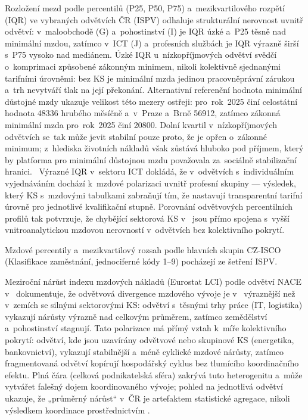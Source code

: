 Rozložení mezd podle percentilů (P25, P50, P75) a~mezikvartilového rozpětí (\ac{IQR}) ve vybraných odvětvích ČR (\ac{ISPV}) odhaluje strukturální nerovnost uvnitř odvětví: v~maloobchodě (G) a~pohostinství (I) je \ac{IQR} úzké a~P25 těsně nad minimální mzdou, zatímco v~ICT (J) a~profesních službách je \ac{IQR} výrazně širší s~P75 vysoko nad mediánem.
Úzké \ac{IQR} u~nízkopříjmových odvětví svědčí o~komprimaci způsobené zákonným minimem, nikoli kolektivně sjednanými tarifními úrovněmi: bez \ac{KS} je minimální mzda jedinou pracovněprávní zárukou a~trh nevytváří tlak na její překonání.
Alternativní referenční hodnota minimální důstojné mzdy ukazuje velikost této mezery ostřeji: pro~rok~2025 činí celostátní hodnota \SI{48336}{\czk} hrubého měsíčně a~v~Praze a~Brně \SI{56912}{\czk}, zatímco zákonná minimální mzda pro~rok~2025 činí \SI{20800}{\czk}. Dolní kvartil v~nízkopříjmových odvětvích se~tak může jevit stabilní pouze proto, že je opřen o~zákonné minimum; z~hlediska životních nákladů však zůstává hluboko pod příjmem, který by platforma pro minimální důstojnou mzdu považovala za~sociálně stabilizační hranici.~\cite{PlatformaMDM_TZ2025}
Výrazné \ac{IQR} v~sektoru ICT dokládá, že v~odvětvích s~individuálním vyjednáváním dochází k~mzdové polarizaci uvnitř profesní skupiny --- výsledek, který \ac{KS} s~mzdovými tabulkami zabraňují tím, že nastavují transparentní tarifní úrovně pro jednotlivé kvalifikační stupně.
Porovnání odvětvových percentilních profilů tak potvrzuje, že chybějící sektorová \ac{KS} v~ jsou přímo spojena s~vyšší vnitroanalytickou mzdovou nerovností v~odvětvích bez kolektivního pokrytí.

Mzdové percentily a~mezikvartilový rozsah podle hlavních skupin CZ-ISCO (Klasifikace zaměstnání, jednociferné kódy 1--9) pocházejí ze šetření \acs{ISPV}.\par

Meziroční nárůst indexu mzdových nákladů (Eurostat \ac{LCI}) podle odvětví \ac{NACE} v~ dokumentuje, že odvětvová divergence mzdového vývoje je v~ výraznější než v~zemích se silnými sektorovými \ac{KS}: odvětví s~těsnými trhy práce (IT, logistika) vykazují nárůsty výrazně nad celkovým průměrem, zatímco zemědělství a~pohostinství stagnují.
Tato polarizace má přímý vztah k~míře kolektivního pokrytí: odvětví, kde jsou uzavírány odvětvové nebo skupinové \ac{KS} (energetika, bankovnictví), vykazují stabilnější a~méně cyklické mzdové nárůsty, zatímco fragmentovaná odvětví kopírují hospodářský cyklus bez tlumícího koordinačního efektu.
Plná čára (celková podnikatelská sféra) zakrývá tuto heterogenitu a~může vytvářet falešný dojem koordinovaného vývoje; pohled na jednotlivá odvětví ukazuje, že „průměrný nárůst“ v~ČR je artefaktem statistické agregace, nikoli výsledkem koordinace prostřednictvím .

